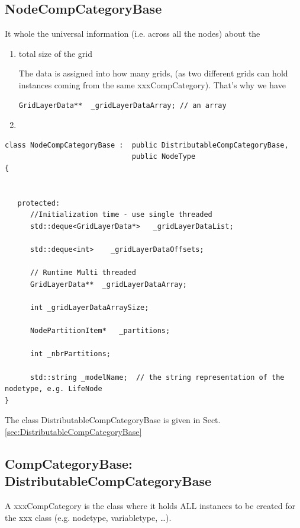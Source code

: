 \subsection{NodeCompCategoryBase}
\label{sec:NodeCompCategoryBase}


It whole the universal information (i.e. across all the nodes) about the 
\begin{enumerate}
  \item total size of the grid
  
  The data is assigned into how many grids, (as two different grids can hold instances coming from the same xxxCompCategory).
  That's why we have 
\begin{verbatim}
GridLayerData**  _gridLayerDataArray; // an array
\end{verbatim}
  
  \item 
\end{enumerate}

\begin{verbatim}
class NodeCompCategoryBase :  public DistributableCompCategoryBase, 
                              public NodeType
{


   protected:
      //Initialization time - use single threaded
      std::deque<GridLayerData*>   _gridLayerDataList;
      
      std::deque<int>    _gridLayerDataOffsets;
      
      // Runtime Multi threaded
      GridLayerData**  _gridLayerDataArray;
      
      int _gridLayerDataArraySize;
      
      NodePartitionItem*   _partitions;
      
      int _nbrPartitions;
      
      std::string _modelName;  // the string representation of the nodetype, e.g. LifeNode
}
\end{verbatim}
The class DistributableCompCategoryBase is given in Sect.\ref{sec:DistributableCompCategoryBase}



\subsection{CompCategoryBase: DistributableCompCategoryBase}
\label{sec:CompCategoryBase}
\label{sec:DistributableCompCategoryBase}

A xxxCompCategory is the class where it holds ALL instances to be created for
the xxx class (e.g. nodetype, variabletype, \ldots).

